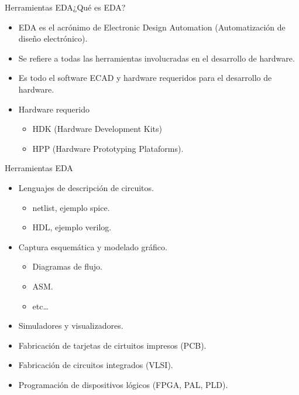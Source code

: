 \documentclass{beamer}
\begin{document}
\begin{frame}{Herramientas EDA}{¿Qué es EDA?}
  \begin{itemize}
  \item EDA es el acrónimo de Electronic Design Automation (Automatización de diseño electrónico).
  \item Se refiere a todas las herramientas involucradas en el desarrollo de hardware.
  \item Es todo el software ECAD y hardware requeridos para el desarrollo de hardware.
  \item Hardware requerido
    \begin{itemize}
    \item HDK (Hardware Development Kits)
    \item HPP (Hardware Prototyping Plataforms).
    \end{itemize}
  \end{itemize}
\end{frame}

\begin{frame}{Herramientas EDA}
  \begin{itemize}
  \item Lenguajes de descripción de circuitos.
    \begin{itemize}
    \item netlist, ejemplo spice.
    \item HDL, ejemplo verilog.
    \end{itemize}
    \vspace{9pt}
  \item Captura esquemática y modelado gráfico.
    \begin{itemize}
    \item Diagramas de flujo.
    \item ASM.
    \item etc\dots{}
    \end{itemize}

    \vspace{9pt}
  \item Simuladores y visualizadores.
    \vspace{9pt}
  \item Fabricación de tarjetas de cirtuitos impresos (PCB).
  \item Fabricación de circuitos integrados (VLSI).
  \item Programación de dispositivos lógicos (FPGA, PAL, PLD).
  \end{itemize}
\end{frame}
\end{document}
